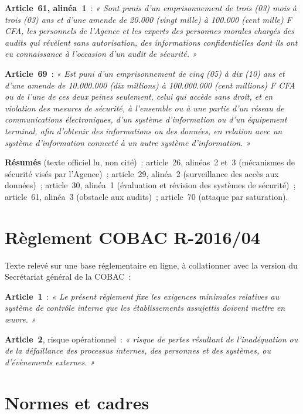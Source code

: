 \begin{boxjuris}
\medskip
\textbf{Article~61, alinéa~1}~: \textit{« Sont punis d'un emprisonnement de
trois (03) mois à trois (03) ans et d'une amende de 20.000 (vingt mille) à
100.000 (cent mille) F CFA, les personnels de l'Agence et les experts des
personnes morales chargés des audits qui révèlent sans autorisation, des
informations confidentielles dont ils ont eu connaissance à l'occasion
d'un audit de sécurité. »}

\medskip
\textbf{Article~69}~: \textit{« Est puni d'un emprisonnement de cinq (05) à
dix (10) ans et d'une amende de 10.000.000 (dix millions) à 100.000.000
(cent millions) F CFA ou de l'une de ces deux peines seulement, celui qui
accède sans droit, et en violation des mesures de sécurité, à l'ensemble ou
à une partie d'un réseau de communications électroniques, d'un système
d'information ou d'un équipement terminal, afin d'obtenir des informations
ou des données, en relation avec un système d'information connecté à un
autre système d'information. »}

\medskip
\textbf{Résumés} (texte officiel lu, non cité)~: article~26, alinéas~2
et~3 (mécanismes de sécurité visés par l'Agence)~; article~29, alinéa~2
(surveillance des accès aux données)~; article~30, alinéa~1 (évaluation et
révision des systèmes de sécurité)~; article~61, alinéa~3 (obstacle aux
audits)~; article~70 (attaque par saturation).
\end{boxjuris}

\section*{Règlement COBAC R-2016/04}

\begin{boxjuris}
Texte relevé sur une base réglementaire en ligne, à collationner avec la
version du Secrétariat général de la COBAC~:

\medskip
\textbf{Article~1}~: \textit{« Le présent règlement fixe les exigences
minimales relatives au système de contrôle interne que les établissements
assujettis doivent mettre en œuvre. »}

\medskip
\textbf{Article~2}, risque opérationnel~: \textit{« risque de pertes
résultant de l'inadéquation ou de la défaillance des processus internes,
des personnes et des systèmes, ou d'évènements externes. »}
\end{boxjuris}

\section*{Normes et cadres}

